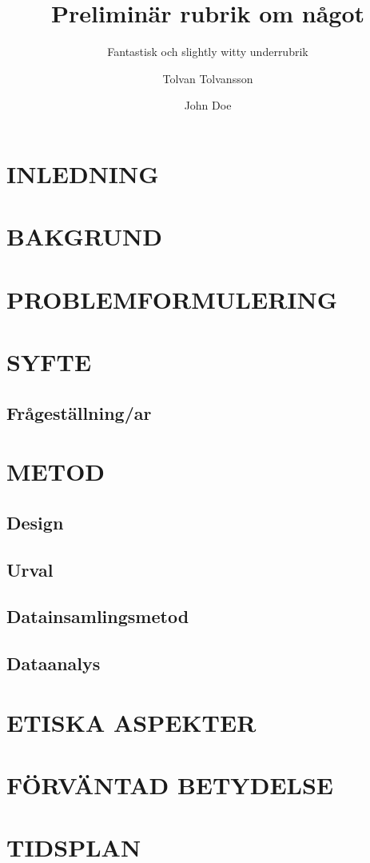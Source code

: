 \documentclass[
    a4paper,
    12pt,
    halfparskip,
]{rkhpm}
\title{Preliminär rubrik om något}
\subtitle{Fantastisk och slightly witty underrubrik}
\author{Tolvan Tolvansson \and John Doe}
\begin{document}
 

\maketitle
\thispagestyle{empty}
\setcounter{page}{0}

\section*{INLEDNING}

\lipsum
\section*{BAKGRUND}

\lipsum
\section*{PROBLEMFORMULERING}

\lipsum
\section*{SYFTE}

\subsection*{Frågeställning/ar}

\lipsum
\section*{METOD}

\subsection*{Design}

\subsection*{Urval}

\subsection*{Datainsamlingsmetod}

\subsection*{Dataanalys}

\lipsum
\section*{ETISKA ASPEKTER}

\lipsum
\section*{FÖRVÄNTAD BETYDELSE}

%

\lipsum
\section*{TIDSPLAN}

\lipsum
\end{document}
